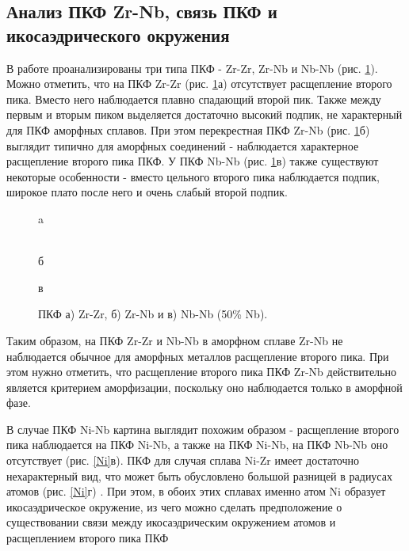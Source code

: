\subsection{Анализ ПКФ Zr-Nb, связь ПКФ и икосаэдрического окружения}
В работе проанализированы  три типа ПКФ - Zr-Zr, Zr-Nb и Nb-Nb (рис. \ref{RDF_full}). Можно отметить, что на ПКФ Zr-Zr (рис. \ref{RDF_full}а) отсутствует расщепление второго пика. Вместо него наблюдается плавно спадающий второй пик. Также между первым и вторым пиком выделяется достаточно высокий подпик, не характерный для ПКФ аморфных сплавов. При этом перекрестная ПКФ Zr-Nb (рис. \ref{RDF_full}б)  выглядит типично для аморфных соединений - наблюдается характерное расщепление второго пика ПКФ.
У ПКФ Nb-Nb (рис. \ref{RDF_full}в)  также существуют некоторые особенности - вместо цельного второго пика наблюдается подпик, широкое плато после него и очень слабый второй подпик. 

\begin{figure}[h!]
	\begin{minipage}[h]{0.32\linewidth}
		 a \\
	\end{minipage}
	\hfill
	\begin{minipage}[h]{0.32\linewidth}
		 \\б
	\end{minipage}
	\hfill
	\begin{minipage}[h]{0.32\linewidth}
		 в \\
	\end{minipage}
	\caption{ПКФ а) Zr-Zr, б) Zr-Nb и в) Nb-Nb (50\% Nb).}
	\label{RDF_full}
\end{figure}


Таким образом, на ПКФ Zr-Zr и Nb-Nb в аморфном сплаве Zr-Nb не наблюдается обычное  для аморфных металлов расщепление второго пика. При этом нужно отметить, что расщепление второго пика ПКФ  Zr-Nb действительно является критерием аморфизации, поскольку оно наблюдается только в аморфной фазе. 

В случае ПКФ Ni-Nb картина выглядит похожим образом  - расщепление второго пика наблюдается на ПКФ Ni-Nb, а также на ПКФ Ni-Nb, на ПКФ Nb-Nb оно отсутствует (рис. \ref{Ni}в). 
ПКФ для случая сплава Ni-Zr имеет достаточно нехарактерный вид, что  может быть обусловлено большой разницей в радиусах атомов (рис. \ref{Ni}г) . При этом, в обоих этих сплавах именно атом Ni образует икосаэдрическое окружение, из чего можно сделать предположение о существовании связи между икосаэдрическим окружением атомов и расщеплением второго пика ПКФ

